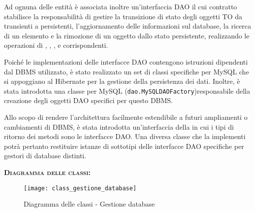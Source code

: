 \begin{description}
Ad ognuna delle entità è associata inoltre un'interfaccia DAO il cui contratto stabilisce la responsabilità di gestire la transizione di stato degli oggetti TO da transienti a persistenti, l'aggiornamento delle informazioni sul database, la ricerca di un elemento e la rimozione di un oggetto dallo stato persistente, realizzando le operazioni di , , ,  e  corrispondenti.

Poiché le implementazioni delle interfacce DAO contengono istruzioni dipendenti dal DBMS utilizzato, è stato realizzato un set di classi specifiche per MySQL che si appoggiano al  Hibernate per la gestione della persistenza dei dati. Inoltre, è stata introdotta una classe  per MySQL (\texttt{dao.MySQLDAOFactory})responsabile della creazione degli oggetti DAO specifici per questo DBMS\@.

Allo scopo di rendere l'architettura facilmente estendibile a futuri ampliamenti o cambiamenti di DBMS, è stata introdotta un'interfaccia della  in cui i tipi di ritorno dei metodi sono le interfacce DAO\@. Una diversa classe  che la implementi potrà pertanto restituire istanze di sottotipi delle interfacce DAO specifiche per gestori di database distinti.

\item{\scshape\bfseries Diagramma delle classi:}
\begin{figure}[H]
  \centering
  \texttt{[image: class\_gestione\_database]}
  \caption{Diagramma delle classi - Gestione database}\label{fig:gestione_database}
\end{figure}


\end{description}
